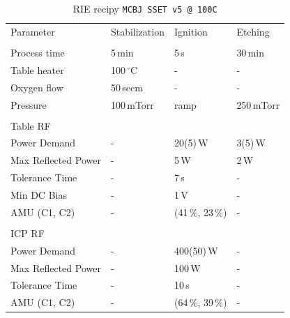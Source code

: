         \begin{table}
            \centering
            \caption{RIE recipy \texttt{MCBJ SSET v5 @ 100C}}
            \label{tab:methods:rie_parameter}
            \begin{tabular}{llll}
                Parameter       & Stabilization         & Ignition      & Etching  \\
                \\\hline
                Process time    & 5\,min                & 5\,s          & 30\,min       \\
                Table heater    & 100\,$^\circ$C   & -             & -             \\
                Oxygen flow     & 50\,sccm           & -             & -             \\
    
                Pressure        & 100\,mTorr & ramp & 250\,mTorr \\       
    
                \\\hline
                Table RF &&&\\
                Power Demand            & - & 20(5)\,W              & 3(5)\,W \\
                Max Reflected Power     & - & 5\,W                  & 2\,W \\
                Tolerance Time          & - & 7\,s                  & - \\
                Min DC Bias             & - & 1\,V                  & - \\
                AMU (C1, C2)            & - & (41\,\%, 23\,\%)      & - \\
    
                \\\hline
                ICP RF &&&\\
                Power Demand            & - & 400(50)\,W            & - \\
                Max Reflected Power     & - & 100\,W                & - \\
                Tolerance Time          & - & 10\,s                 & - \\
                AMU (C1, C2)            & - & (64\,\%, 39\,\%)      & - \\
                
            \end{tabular}
        \end{table}
        
